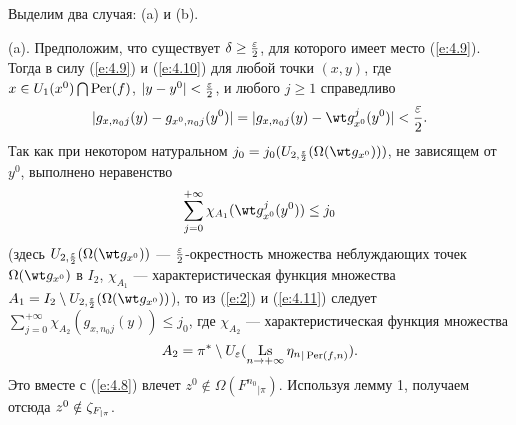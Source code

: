 \begin{pf}
Выделим два случая: (a) и (b).

(a). Предположим, что существует $\delta\geq\frac{\varepsilon}{2}$,
для которого имеет место (\ref{e:4.9}).
Тогда в силу (\ref{e:4.9}) и (\ref{e:4.10}) для любой точки $(x, y)$, где
$x\in U_1(x^0)\bigcap \operatorname{Per}(f)$, $|y - y^0|<\frac{\varepsilon}{2}$, и любого
$j\geq 1$ справедливо
\begin{equation}\label{e:4.11}
|g_{x, n_0j}(y) - g_{x^0, n_0j}(y^0)|=
|g_{x, n_0j}(y) - \wt g_{x^0}^j(y^0)|<\frac{\e}{2}.
\end{equation}
Так как при некотором натуральном
$j_0=j_0(U_{2, \frac{\e}{2}} (\Omega(\wt g_{x^0})))$,
не зависящем от $y^0$,
выполнено неравенство
$$
\sum\limits_{j=0}^{+\infty}\chi_{A_1}(\wt g_{x^0}^j(y^0))\leq j_0
$$
(здесь $U_{2, \frac{\e}{2}}(\Omega(\wt g_{x^0}))$
--- $\frac{\varepsilon}{2}$-окрестность множества неблуждающих точек
$\Omega(\wt g_{x^0})$ в $I_2$, $\chi_{A_1}$ ---
характеристическая функция множества
$A_1=I_2\setminus U_{2, \frac{\e}{2}}(\Omega(\wt g_{x^0}))$),
то из (\ref{e:2}) и (\ref{e:4.11}) следует
$\sum\limits_{j=0}^{+\infty}\chi_{A_2}(g_{x, n_0j}(y))\leq j_0$,
где $\chi_{A_2}$ --- характеристическая функция
множества
$$
A_2=\pi^*\setminus U_{\e}
(\Ls\limits_{n\to +\infty}{\eta_n}_{|\Per(f, n)}).
$$
Это вместе с (\ref{e:4.8}) влечет
$z^0\notin\Omega({F^{n_0}}_{|\pi})$.
Используя лемму 1, получаем отсюда $z^0\notin\zeta_{F_{|\pi}}$.


\end{pf}
